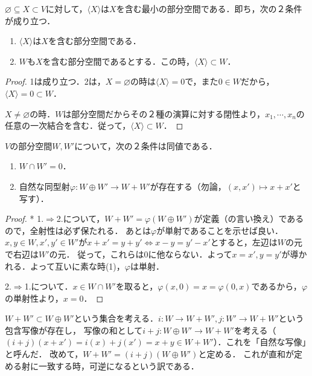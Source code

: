 \documentclass[uplatex, dvipdfmx]{jsreport}
\begin{document}
\begin{proposition}[生成する部分空間の特徴付け：閉包]
    $\varnothing\subseteq X\subset V$に対して，$\langle X\rangle$は$X$を含む最小の部分空間である．即ち，次の２条件が成り立つ．
    \begin{enumerate}
        \item $\langle X\rangle$は$X$を含む部分空間である．
        \item $W$も$X$を含む部分空間であるとする．この時，$\langle X\rangle\subset W$．
    \end{enumerate}
\end{proposition}
\begin{proof}
    1は成り立つ．2は，$X=\varnothing$の時は$\langle X\rangle =0$で，また$0\in W$だから，$\langle X\rangle =0\subset W$．

    $X\ne\varnothing$の時．$W$は部分空間だからその２種の演算に対する閉性より，$x_1,\cdots,x_n$の任意の一次結合を含む．従って，$\langle X\rangle\subset W$．
\end{proof}

\begin{proposition}[互いに素であることの特徴付け]\label{prop-characterization-of-direct-sum-2}
    $V$の部分空間$W,W'$について，次の２条件は同値である．
    \begin{enumerate}
        \item $W\cap W'=0$．
        \item 自然な同型射$\varphi:W\oplus W'\to W+W'$が存在する（勿論，$(x,x')\mapsto x+x'$と写す）．
    \end{enumerate}
\end{proposition}
\begin{proof}* 
    1.$\Rightarrow$2.について，$W+W'=\varphi(W\oplus W')$が定義（の言い換え）であるので，全射性は必ず保たれる．
    あとは$\varphi$が単射であることを示せば良い．
    $x,y\in W,x',y'\in W'$が$x+x'=y+y'\Leftrightarrow x-y=y'-x'$とすると，左辺は$W$の元で右辺は$W'$の元．
    従って，これらは$0$に他ならない．よって$x=x',y=y'$が導かれる．よって互いに素な時(1)，$\varphi$は単射．

    2.$\Rightarrow$1.について．$x\in W\cap W'$を取ると，$\varphi(x,0)=x=\varphi(0,x)$であるから，$\varphi$の単射性より，$x=0$．
\end{proof}
\begin{remark}
    $W+W'\subset W\oplus W'$という集合を考える．$i:W\to W+W', j:W'\to W+W'$という包含写像が存在し，
    写像の和として$i+j:W\oplus  W'\to W+W'$を考える（$(i+j)(x+x')=i(x)+j(x')=x+y\in W+W'$）．これを「自然な写像」と呼んだ．
    改めて，$W+W'=(i+j)(W\oplus W')$と定める．
    これが直和が定める射に一致する時，可逆になるという訳である．
\end{remark}
\end{document}
